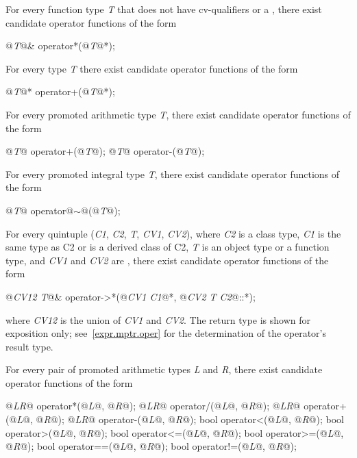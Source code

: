 \pnum
For every function type
\textit{T} that does not have cv-qualifiers or a ,
there exist candidate operator functions of the form

\begin{codeblock}
@\textit{T}@&    operator*(@\textit{T}@*);
\end{codeblock}

\pnum
For every type \textit{T} there exist candidate operator functions of the form

\begin{codeblock}
@\textit{T}@*    operator+(@\textit{T}@*);
\end{codeblock}

\pnum
For every promoted arithmetic type
\textit{T},
there exist candidate operator functions of the form

\begin{codeblock}
@\textit{T}@ operator+(@\textit{T}@);
@\textit{T}@ operator-(@\textit{T}@);
\end{codeblock}

\pnum
For every promoted integral type
\textit{T},
there exist candidate operator functions of the form

\begin{codeblock}
@\textit{T}@ operator@$\sim$@(@\textit{T}@);
\end{codeblock}

\pnum
For every quintuple
(\textit{C1},
\textit{C2},
\textit{T},
\textit{CV1},
\textit{CV2}),
where
\textit{C2}
is a class type,
\textit{C1}
is the same type as C2 or is a derived class of C2,
\textit{T}
is an object type or a function type,
and
\textit{CV1}
and
\textit{CV2}
are
,
there exist candidate operator functions of the form

\begin{codeblock}
@\textit{CV12 T}@& operator->*(@\textit{CV1 C1}@*, @\textit{CV2 T C2}@::*);
\end{codeblock}

where
\textit{CV12}
is the union of
\textit{CV1}
and
\textit{CV2}.
The return type is shown for exposition only; see~\ref{expr.mptr.oper} for the
determination of the operator's result type.

\pnum
For every pair of promoted arithmetic types
\textit{L}
and
\textit{R},
there exist candidate operator functions of the form

\begin{codeblock}
@\textit{LR}@      operator*(@\textit{L}@, @\textit{R}@);
@\textit{LR}@      operator/(@\textit{L}@, @\textit{R}@);
@\textit{LR}@      operator+(@\textit{L}@, @\textit{R}@);
@\textit{LR}@      operator-(@\textit{L}@, @\textit{R}@);
bool    operator<(@\textit{L}@, @\textit{R}@);
bool    operator>(@\textit{L}@, @\textit{R}@);
bool    operator<=(@\textit{L}@, @\textit{R}@);
bool    operator>=(@\textit{L}@, @\textit{R}@);
bool    operator==(@\textit{L}@, @\textit{R}@);
bool    operator!=(@\textit{L}@, @\textit{R}@);
\end{codeblock}

